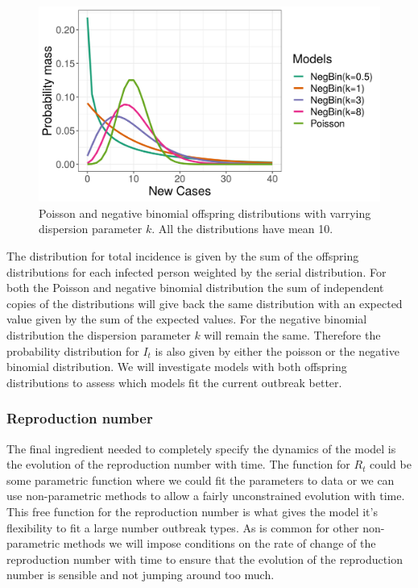 \documentclass[12pt]{article}
\begin{document}
\begin{figure}[h]
  \centering
  \includegraphics[width=\textwidth]{../output/prob_dist.png}
  \caption{Poisson and negative binomial offspring distributions with varrying dispersion parameter $k$. All the distributions have mean 10.}
  \label{fig:offspring}
\end{figure}

The distribution for total incidence is given by the sum of the offspring distributions for each infected person weighted by the serial distribution. For both the Poisson and negative binomial distribution the sum of independent copies of the distributions will give back the same distribution with an expected value given by the sum of the expected values. For the negative binomial distribution the dispersion parameter $k$ will remain the same. Therefore the probability distribution for $I_t$ is also given by either the poisson or the negative binomial distribution. We will investigate models with both offspring distributions to assess which models fit the current outbreak better.

\subsubsection{Reproduction number}
The final ingredient needed to completely specify the dynamics of the model is the evolution of the reproduction number with time. The function for $R_t$ could be some parametric function where we could fit the parameters to data or we can use non-parametric methods to allow a fairly unconstrained evolution with time. This free function for the reproduction number is what gives the model it's flexibility to fit a large number outbreak types. As is common for other non-parametric methods we will impose conditions on the rate of change of the reproduction number with time to ensure that the evolution of the reproduction number is sensible and not jumping around too much.
\end{document}
